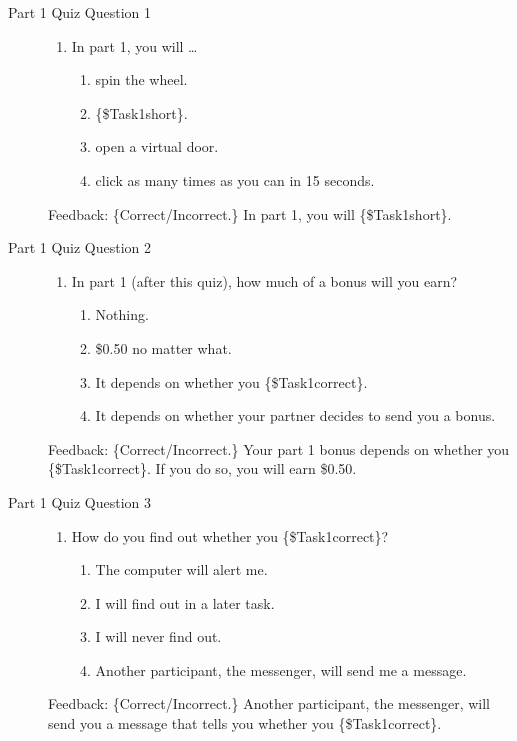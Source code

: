 \begin{description}
\item[Part 1 Quiz Question 1] \hspace{1cm}
\begin{enumerate}
\item In part 1, you will \ldots
\begin{enumerate}
    \item spin the wheel. 
\item \{\$Task1short\}. 
    \item open a virtual door. 
    \item click as many times as you can in 15 seconds. 
\end{enumerate}
\end{enumerate}

Feedback: \{Correct/Incorrect.\} In part 1, you will \{\$Task1short\}.

\item[Part 1 Quiz Question 2] \hspace{1cm}
\begin{enumerate}
\item In part 1 (after this quiz), how much of a bonus will you earn?
\begin{enumerate}
    \item Nothing. 
    \item \$0.50 no matter what. 
    \item It depends on whether you \{\$Task1correct\}.
    \item It depends on whether your partner decides to send you a bonus.
\end{enumerate}
\end{enumerate}

Feedback: \{Correct/Incorrect.\} Your part 1 bonus depends on whether you
\{\$Task1correct\}. If you do so, you will earn \$0.50.

\item[Part 1 Quiz Question 3] \hspace{1cm} 
\begin{enumerate} 
\item How do you find out whether you \{\$Task1correct\}?
\begin{enumerate} 
\item The computer will alert me.
\item I will find out in a later task.
\item I will never find out.
\item Another participant, the messenger, will send me a message.    
\end{enumerate} 
\end{enumerate}

Feedback: \{Correct/Incorrect.\} Another participant, the messenger, will send
you a message that tells you whether you \{\$Task1correct\}.
\end{description}

